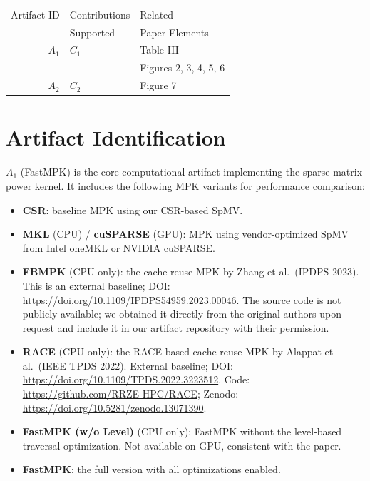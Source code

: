 \documentclass[conference]{IEEEtran}
\begin{document}
\begin{center}
\begin{tabular}{rll}
\toprule
Artifact ID  &  Contributions &  Related \\
             &  Supported     &  Paper Elements \\
\midrule
$A_1$   &  $C_1$ & Table III \\
        &        & Figures 2, 3, 4, 5, 6 \\
\midrule
$A_2$   &  $C_2$ & Figure 7 \\
\bottomrule
\end{tabular}
\end{center}


\section{Artifact Identification}

\newartifact
\artrel

$A_1$ (FastMPK) is the core computational artifact implementing the sparse matrix power kernel. It includes the following MPK variants for performance comparison:

\begin{itemize}
  \item \textbf{CSR}: baseline MPK using our CSR-based SpMV.
  \item \textbf{MKL} (CPU) / \textbf{cuSPARSE} (GPU): MPK using vendor-optimized SpMV from Intel oneMKL or NVIDIA cuSPARSE.
  \item \textbf{FBMPK} (CPU only): the cache-reuse MPK by Zhang et al.\ (IPDPS 2023). This is an external baseline; DOI: \url{https://doi.org/10.1109/IPDPS54959.2023.00046}. The source code is not publicly available; we obtained it directly from the original authors upon request and include it in our artifact repository with their permission.
  \item \textbf{RACE} (CPU only): the RACE-based cache-reuse MPK by Alappat et al.\ (IEEE TPDS 2022). External baseline; DOI: \url{https://doi.org/10.1109/TPDS.2022.3223512}. Code: \url{https://github.com/RRZE-HPC/RACE}; Zenodo: \url{https://doi.org/10.5281/zenodo.13071390}.
  \item \textbf{FastMPK (w/o Level)} (CPU only): FastMPK without the level-based traversal optimization. Not available on GPU, consistent with the paper.
  \item \textbf{FastMPK}: the full version with all optimizations enabled.
\end{itemize}
\end{document}
